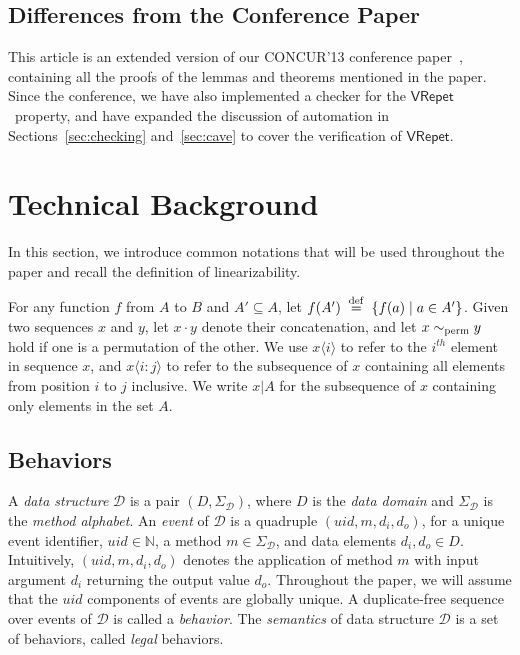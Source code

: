 \documentclass{LMCS}
\newcommand{\defeq}{\;\stackrel{\rm def}{=}\;}
\newcommand{\uid}{\ensuremath{\mathit{uid}}}
\newcommand{\permeq}{\sim_{\rm perm}}
\newcommand{\seqx}[2]{\ensuremath{#1\langle #2\rangle}}
\newcommand{\VRepet}{\ensuremath{\mathsf{VRepet}}}
\begin{document}
\subsection*{Differences from the Conference Paper}

This article is an extended version of our CONCUR'13 conference paper~\cite{HSV2013},
containing all the proofs of the lemmas and theorems mentioned in the paper.
Since the conference, we have also implemented a checker for the \VRepet\ property,
and have expanded the discussion of automation in Sections~\ref{sec:checking} 
and~\ref{sec:cave} to cover the verification of \VRepet.



\section{Technical Background}
\label{sec:back}

In this section, we introduce common notations that will be used throughout the paper and recall the definition of linearizability.

For any function $f$ from $A$ to $B$ and $A'\subseteq A$, let $f(A') \defeq \{f(a) \mid a\in A'\}$.
Given two sequences $x$ and $y$, let $x\cdot y$ denote their concatenation, and let $x\permeq y$ hold if one is a permutation of the other.
We use $\seqx x i$ to refer to the $i^{th}$ element in sequence $x$,
and $\seqx x {i:j}$ to refer to the subsequence of $x$ containing all 
elements from position $i$ to $j$ inclusive.
We write $x|A$ for the subsequence of $x$ containing only
elements in the set $A$.

\subsection*{Behaviors}

A {\em data structure} $\mathcal{D}$ is a pair $(D,\Sigma_{\mathcal{D}})$, where $D$ is the {\em data domain} and $\Sigma_{\mathcal{D}}$ is the {\em method alphabet}.
An {\em event} of $\mathcal{D}$ is a quadruple $(\uid,m,d_i,d_o)$, for a unique event identifier, $\uid\in\mathbb{N}$, a method $m\in\Sigma_{\mathcal{D}}$, and data elements $d_i,d_o\in D$.
Intuitively, $(\uid,m,d_i,d_o)$ denotes the application of method $m$ with input argument $d_i$ returning the output value $d_o$.
Throughout the paper, we will assume that the $\uid$ components of events are globally unique.
A duplicate-free sequence over events of $\mathcal{D}$ is called a {\em behavior}.
The {\em semantics} of data structure $\mathcal{D}$ is a set of behaviors, called {\em legal} behaviors.
\end{document}
